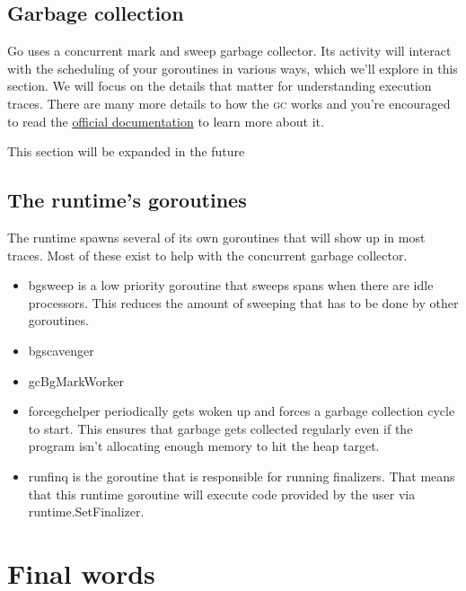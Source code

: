 \documentclass[10pt,letterpaper,oneside,openany,english]{memoir}
\newcommand{\code}[1]{{\ttfamily\mbox{#1}}}
\newcommand{\todo}[1]{{\color{red}#1}}
\begin{document}
\section{Garbage collection}\label{gc}
Go uses a concurrent mark and sweep garbage collector.
Its activity will interact with the scheduling of your goroutines in various ways,
which we'll explore in this section.
We will focus on the details that matter for understanding execution traces.
There are many more details to how the \textsc{gc} works
and you're encouraged to read the \href{https://go.dev/doc/gc-guide}{official documentation}\cite{GuideGoGarbage} to learn more about it.


\todo{This section will be expanded in the future}

\section{The runtime's goroutines}
The runtime spawns several of its own goroutines that will show up in most traces.
Most of these exist to help with the concurrent garbage collector.

\begin{itemize}
\item \code{bgsweep} is a low priority goroutine that sweeps spans when there are idle processors. This reduces the amount
  of sweeping that has to be done by other goroutines.
\item \todo{bgscavenger}
\item \todo{gcBgMarkWorker}
\item \code{forcegchelper} periodically gets woken up and forces a garbage collection cycle to start.
  This ensures that garbage gets collected regularly even if the program isn't allocating enough memory to hit the heap target.
\item \code{runfinq} is the goroutine that is responsible for running finalizers.
  That means that this runtime goroutine will execute code provided by the user via \code{runtime.SetFinalizer}.
\end{itemize}

\chapter{Final words}
\end{document}
